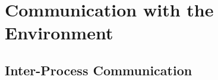 \section{Communication with the Environment}
{ \textcolor{gray}\blindtext }

\subsection{Inter-Process Communication}
{ \textcolor{gray}\blindtext }

